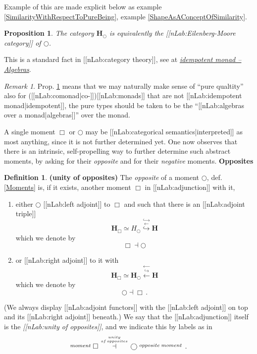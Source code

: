 \documentclass[12pt,titlepage]{article}
\theoremstyle{plain}
\newtheorem{prop}{Proposition}
\theoremstyle{definition}
\newtheorem{defn}{Definition}
\theoremstyle{remark}
\newtheorem{remark}{Remark}
\begin{document}
Example of this are made explicit below as example \ref{SimilarityWithRespectToPureBeing}, example \ref{ShapeAsAConceptOfSimilarity}.
\begin{prop}
\label{bigcircpureObjectsAreEMObjects}\hypertarget{bigcircpureObjectsAreEMObjects}{}
The category $\mathbf{H}_{\bigcirc}$ is equivalently the [[nLab:Eilenberg-Moore category]] of $\bigcirc$.
\end{prop}
This is a standard fact in [[nLab:category theory]], see at \emph{\href{idempotent+monad#AlgebrasForAnIdempotentMonad}{idempotent monad -- Algebras}}.
\begin{remark}
\label{PurityForNonIdempotent}\hypertarget{PurityForNonIdempotent}{}
Prop. \ref{bigcircpureObjectsAreEMObjects} means that we may naturally make sense of ``pure qualtity'' also for ([[nLab:comonad|co-]])[[nLab:monads]] that are not [[nLab:idempotent monad|idempotent]], the pure types should be taken to be the ``[[nLab:algebras over a monad|algebras]]'' over the monad.
\end{remark}
A single moment $\Box$ or $\bigcirc$ may be [[nLab:categorical semantics|interpreted]] as most anything, since it is not further determined yet. One now observes that there is an intrinsic, self-propelling way to further determine such abstract moments, by asking for their \emph{opposite} and for their \emph{negative} moments.
\textbf{Opposites}
\begin{defn}
\label{UnityOfOpposites}\hypertarget{UnityOfOpposites}{}
\textbf{(unity of opposites)}
The \emph{opposite} of a moment $\bigcirc$, def. \ref{Moments} is, if it exists, another moment $\Box$ in [[nLab:adjunction]] with it,
\begin{enumerate}%
\item either $\bigcirc$ [[nLab:left adjoint]] to $\Box$ and such that there is an [[nLab:adjoint triple]]
\begin{displaymath}
\mathbf{H}_{\Box}\simeq H_{\bigcirc}
  \stackrel{\hookrightarrow}{\stackrel{\longleftarrow}{\hookrightarrow}}
  \mathbf{H}
\end{displaymath}
which we denote by
\begin{displaymath}
\Box \dashv \bigcirc
\end{displaymath}
\item or [[nLab:right adjoint]] to it with
\begin{displaymath}
\mathbf{H}_{\Box}\simeq \mathbf{H}_{\bigcirc}
  \stackrel{\longleftarrow}{\stackrel{\hookrightarrow}{\longleftarrow}}
  \mathbf{H}
\end{displaymath}
which we denote by
\begin{displaymath}
\bigcirc \dashv \Box
  \,.
\end{displaymath}
\end{enumerate}
(We always display [[nLab:adjoint functors]] with the [[nLab:left adjoint]] on top and its [[nLab:right adjoint]] beneath.)
We say that the [[nLab:adjunction]] itself is the \emph{[[nLab:unity of opposites]]}, and we indicate this by labels as in
\begin{displaymath}
\stackrel{moment}{} \Box \stackrel{unity \atop {of\,opposites}}{\dashv} \bigcirc \stackrel{opposite\;moment}{}
  \,.
\end{displaymath}
\end{defn}
\end{document}
